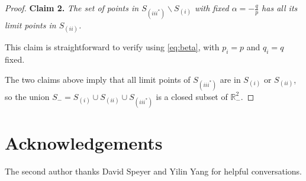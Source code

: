 \documentclass[11pt, letterpaper, reqno]{amsart}
\theoremstyle{definition}
\theoremstyle{remark}
\numberwithin{equation}{section}
\newcommand{\RR}{\ensuremath{\mathbb{R}}}
\newcommand{\Si}{S_{(i)}}
\newcommand{\Sii}{S_{(ii)}}
\newcommand{\Siii}{S_{(iii^*)}}
\begin{document}
\begin{proof}
{\bf Claim 2.} 
{\em The set of points in  $\Siii \smallsetminus \Si $ with fixed $\alpha= -\frac{q}{p}$  
has all its limit points in $\Sii$. }

\noindent This claim is straightforward to verify using \eqref{eq:beta}, with $p_i = p$ and $q_i = q$ fixed.

The  two claims above imply that all limit points of $\Siii$ are  in 
$\Si$ or $\Sii$,
so the union 
${S}_{-} = \Si \cup  \Sii \cup  \Siii$ 
is a closed subset of $\RR^2_{-}$.
\end{proof}


\section*{Acknowledgements}
The second author thanks David Speyer and  Yilin Yang for helpful conversations. 
\end{document}
